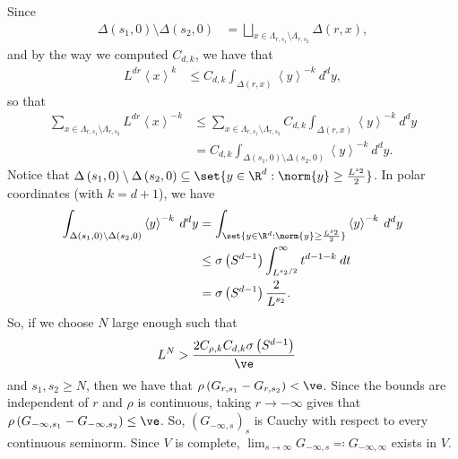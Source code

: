 \documentclass[10pt]{mypackage}
\renewcommand{\eqcolon}{\eqqcolon}
\begin{document}
\begin{solution}
  Since 
  \begin{align*}
    \Delta\left( s_1,0 \right)\setminus\Delta\left( s_2,0 \right) &= \bigsqcup_{x\in \Lambda_{r,s_1}\setminus \Lambda_{r,s_2}} \Delta\left( r,x \right),
  \end{align*}
  and by the way we computed $C_{d,k}$, we have that
  \begin{align*}
    L^{dr} \left\langle x \right\rangle^{k} &\leq C_{d,k} \int_{\Delta\left( r,x \right)}^{} \left\langle y \right\rangle^{-k}\:d^{d}y,
  \end{align*}
  so that
  \begin{align*}
    \sum_{x\in \Lambda_{r,s_1}\setminus \Lambda_{r,s_2}} L^{dr}\left\langle x \right\rangle^{-k} &\leq \sum_{x\in \Lambda_{r,s_1}\setminus \Lambda_{r,s_2}}C_{d,k} \int_{\Delta\left( r,x \right)}^{} \left\langle y \right\rangle^{-k}\:d^{d}y\\
                                 &= C_{d,k} \int_{\Delta\left( s_1,0 \right)\setminus \Delta\left( s_2,0 \right)}^{} \left\langle y \right\rangle^{-k}\:d^{d}y.
  \end{align*}
  Notice that $\Delta\left( s_1,0 \right)\setminus \Delta\left( s_2,0 \right)\subseteq \set{y\in \R^d : \norm{y} \geq \frac{L^{s_2}}{2}}$. In polar coordinates (with $k = d+1$), we have
  \begin{align*}
    \int_{\Delta\left( s_1,0 \right)\setminus \Delta\left( s_2,0 \right)}^{} \left\langle y \right\rangle^{-k}\:d^{d}y &= \int_{\set{y\in \R^d : \norm{y}\geq \frac{L^{s_2}}{2}}}^{} \left\langle y \right\rangle^{-k}\:d^{d}y\\
                                 &\leq \sigma\left( S^{d-1} \right) \int_{L^{s_2/2}}^{\infty} t^{d-1-k}\:dt\\
                                 &= \sigma\left( S^{d-1} \right)\frac{2}{L^{s_2}}.
  \end{align*}
  So, if we choose $N$ large enough such that
  \begin{align*}
    L^N &> \frac{2C_{\rho,k}C_{d,k}\sigma\left( S^{d-1} \right)}{\ve}
  \end{align*}
  and $s_1,s_2 \geq N$, then we have that $\rho\left( G_{r,s_1}-G_{r,s_2} \right) < \ve$. Since the bounds are independent of $r$ and $\rho$ is continuous, taking $r\to -\infty$ gives that $\rho\left( G_{-\infty,s_1}-G_{-\infty,s_2} \right)\leq \ve$. So, $\left( G_{-\infty,s} \right)_{s}$ is Cauchy with respect to every continuous seminorm. Since $V$ is complete, $\lim_{s\to\infty}G_{-\infty,s}\eqcolon G_{-\infty,\infty}$ exists in $V$.


\end{solution}
\end{document}
